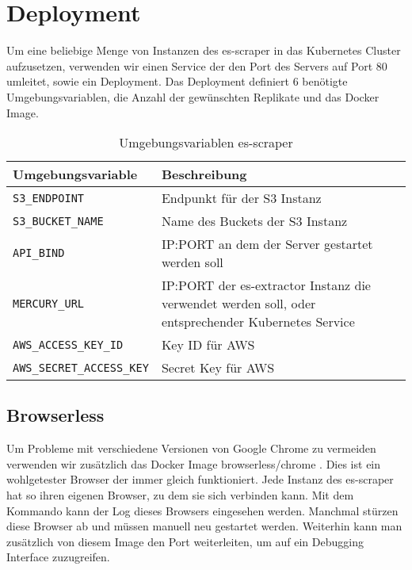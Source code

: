 \section{Deployment} \label{scraper:sec:deployment}
Um eine beliebige Menge von Instanzen des es-scraper in das Kubernetes Cluster aufzusetzen, verwenden wir einen Service der den Port des Servers auf Port 80 umleitet, sowie ein Deployment. Das Deployment definiert 6 benötigte Umgebungsvariablen, die Anzahl der gewünschten Replikate und das Docker Image. \\
\begin{table}[h]
\centering
\begin{tabu}{lX}
	\toprule
	Umgebungsvariable & Beschreibung \\ \midrule
	\texttt{S3\_ENDPOINT}& Endpunkt für der S3 Instanz\\
	\texttt{S3\_BUCKET\_NAME}& Name des Buckets der S3 Instanz\\
	\texttt{API\_BIND}& IP:PORT an dem der Server gestartet werden soll\\
	\texttt{MERCURY\_URL}& IP:PORT der es-extractor Instanz die verwendet werden soll, oder entsprechender Kubernetes Service\\
	\texttt{AWS\_ACCESS\_KEY\_ID} & Key ID für AWS\\
	\texttt{AWS\_SECRET\_ACCESS\_KEY} & Secret Key für AWS\\ \bottomrule
\end{tabu}
\caption{Umgebungsvariablen es-scraper}
\end{table}

\subsection*{Browserless}
Um Probleme mit verschiedene Versionen von Google Chrome zu vermeiden verwenden wir zusätzlich das Docker Image browserless/chrome \cite{browserless}. Dies ist ein wohlgetester Browser der immer gleich funktioniert. Jede Instanz des es-scraper hat so ihren eigenen Browser, zu dem sie sich verbinden kann. Mit dem Kommando 
kann der Log dieses Browsers eingesehen werden. Manchmal stürzen diese Browser ab und müssen manuell neu gestartet werden. Weiterhin kann man zusätzlich von diesem Image den Port weiterleiten, um auf ein Debugging Interface zuzugreifen.